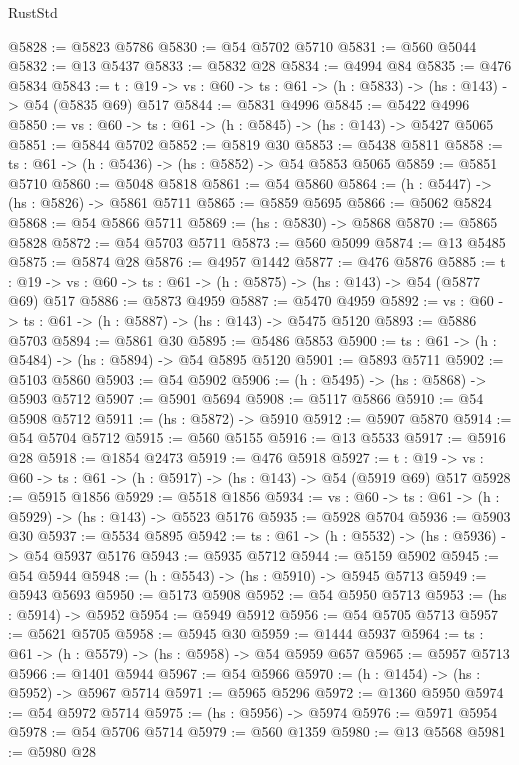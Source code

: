 \begin{lexlean}{RustStd}
\begin{coremodule}
@5828 := @5823 @5786
@5830 := @54 @5702 @5710
@5831 := @560 @5044
@5832 := @13 @5437
@5833 := @5832 @28
@5834 := @4994 @84
@5835 := @476 @5834
@5843 := {t : @19} -> {vs : @60} -> {ts : @61} -> (h : @5833) -> (hs : @143) -> @54 (@5835 @69) @517
@5844 := @5831 @4996
@5845 := @5422 @4996
@5850 := {vs : @60} -> {ts : @61} -> (h : @5845) -> (hs : @143) -> @5427 @5065
@5851 := @5844 @5702
@5852 := @5819 @30
@5853 := @5438 @5811
@5858 := {ts : @61} -> (h : @5436) -> (hs : @5852) -> @54 @5853 @5065
@5859 := @5851 @5710
@5860 := @5048 @5818
@5861 := @54 @5860
@5864 := (h : @5447) -> (hs : @5826) -> @5861 @5711
@5865 := @5859 @5695
@5866 := @5062 @5824
@5868 := @54 @5866 @5711
@5869 := (hs : @5830) -> @5868
@5870 := @5865 @5828
@5872 := @54 @5703 @5711
@5873 := @560 @5099
@5874 := @13 @5485
@5875 := @5874 @28
@5876 := @4957 @1442
@5877 := @476 @5876
@5885 := {t : @19} -> {vs : @60} -> {ts : @61} -> (h : @5875) -> (hs : @143) -> @54 (@5877 @69) @517
@5886 := @5873 @4959
@5887 := @5470 @4959
@5892 := {vs : @60} -> {ts : @61} -> (h : @5887) -> (hs : @143) -> @5475 @5120
@5893 := @5886 @5703
@5894 := @5861 @30
@5895 := @5486 @5853
@5900 := {ts : @61} -> (h : @5484) -> (hs : @5894) -> @54 @5895 @5120
@5901 := @5893 @5711
@5902 := @5103 @5860
@5903 := @54 @5902
@5906 := (h : @5495) -> (hs : @5868) -> @5903 @5712
@5907 := @5901 @5694
@5908 := @5117 @5866
@5910 := @54 @5908 @5712
@5911 := (hs : @5872) -> @5910
@5912 := @5907 @5870
@5914 := @54 @5704 @5712
@5915 := @560 @5155
@5916 := @13 @5533
@5917 := @5916 @28
@5918 := @1854 @2473
@5919 := @476 @5918
@5927 := {t : @19} -> {vs : @60} -> {ts : @61} -> (h : @5917) -> (hs : @143) -> @54 (@5919 @69) @517
@5928 := @5915 @1856
@5929 := @5518 @1856
@5934 := {vs : @60} -> {ts : @61} -> (h : @5929) -> (hs : @143) -> @5523 @5176
@5935 := @5928 @5704
@5936 := @5903 @30
@5937 := @5534 @5895
@5942 := {ts : @61} -> (h : @5532) -> (hs : @5936) -> @54 @5937 @5176
@5943 := @5935 @5712
@5944 := @5159 @5902
@5945 := @54 @5944
@5948 := (h : @5543) -> (hs : @5910) -> @5945 @5713
@5949 := @5943 @5693
@5950 := @5173 @5908
@5952 := @54 @5950 @5713
@5953 := (hs : @5914) -> @5952
@5954 := @5949 @5912
@5956 := @54 @5705 @5713
@5957 := @5621 @5705
@5958 := @5945 @30
@5959 := @1444 @5937
@5964 := {ts : @61} -> (h : @5579) -> (hs : @5958) -> @54 @5959 @657
@5965 := @5957 @5713
@5966 := @1401 @5944
@5967 := @54 @5966
@5970 := (h : @1454) -> (hs : @5952) -> @5967 @5714
@5971 := @5965 @5296
@5972 := @1360 @5950
@5974 := @54 @5972 @5714
@5975 := (hs : @5956) -> @5974
@5976 := @5971 @5954
@5978 := @54 @5706 @5714
@5979 := @560 @1359
@5980 := @13 @5568
@5981 := @5980 @28

\end{coremodule}
\end{lexlean}
